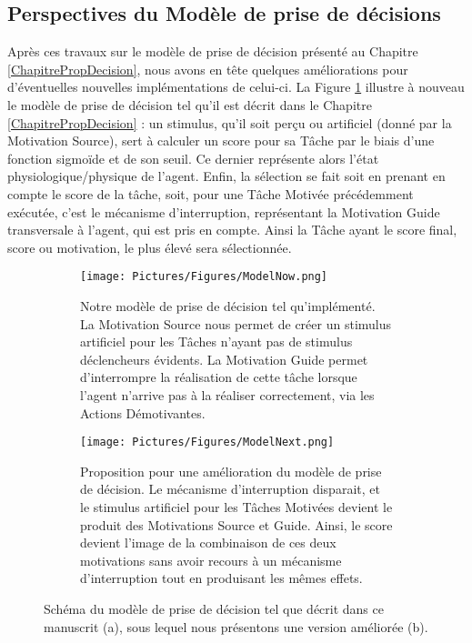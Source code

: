 	\subsection{Perspectives du Modèle de prise de décisions}
	Après ces travaux sur le modèle de prise de décision présenté au Chapitre \ref{ChapitrePropDecision}, nous avons en tête quelques améliorations pour d'éventuelles nouvelles implémentations de celui-ci. La Figure \ref{ModelNow} illustre à nouveau le modèle de prise de décision tel qu'il est décrit dans le Chapitre  \ref{ChapitrePropDecision} : un stimulus, qu'il soit perçu ou artificiel (donné par la Motivation Source), sert à calculer un score pour sa Tâche par le biais d'une fonction sigmoïde et de son seuil. Ce dernier représente alors l'état physiologique/physique de l'agent. Enfin, la sélection se fait soit en prenant en compte le score de la tâche, soit, pour une Tâche Motivée précédemment exécutée, c'est le mécanisme d'interruption, représentant la Motivation Guide transversale à l'agent, qui est pris en compte. Ainsi la Tâche ayant le score final, score ou motivation, le plus élevé sera sélectionnée.
	
	\begin{figure}
	\centering
	
	\begin{subfigure}{\textwidth}
	\centering
	\texttt{[image: Pictures/Figures/ModelNow.png]}
	\caption{Notre modèle de prise de décision tel qu'implémenté. La Motivation Source nous permet de créer un stimulus artificiel pour les Tâches n'ayant pas de stimulus déclencheurs évidents. La Motivation Guide permet d'interrompre la réalisation de cette tâche lorsque l'agent n'arrive pas à la réaliser correctement, via les Actions Démotivantes.}
	\label{ModelNow}	
	\end{subfigure}
	
	\begin{subfigure}{\textwidth}
	\centering
	\texttt{[image: Pictures/Figures/ModelNext.png]}
	\caption{Proposition pour une amélioration du modèle de prise de décision. Le mécanisme d'interruption disparait, et le stimulus artificiel pour les Tâches Motivées devient le produit des Motivations Source et Guide. Ainsi, le score devient l'image de la combinaison de ces deux motivations sans avoir recours à un mécanisme d'interruption tout en produisant les mêmes effets.}
	\label{ModelNext}
	\end{subfigure}
	
	\caption{Schéma du modèle de prise de décision tel que décrit dans ce manuscrit (a), sous lequel nous présentons une version améliorée (b).}	
	\label{ModelsBeforeAfter}
	\end{figure}
	
